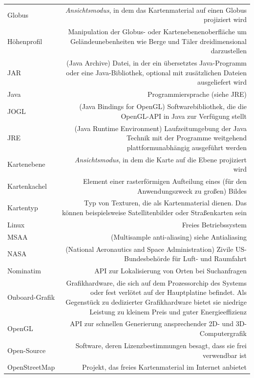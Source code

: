 \documentclass[10pt]{scrreprt}
\newcommand{\textref}[1]{\mbox{\raisebox{0.1ex}{\small$\rightarrow$ }\textit{#1}}}
\begin{document}
\begin{longtabu}{L{0.35} R{1.65}}
Globus  & \textref{Ansichtsmodus}, in dem das Kartenmaterial auf einen Globus projiziert wird\\
Höhenprofil  & Manipulation der Globus- oder Kartenebenenoberfläche um Geländeunebenheiten wie Berge und Täler dreidimensional darzustellen\\
JAR  & (Java Archive) Datei, in der ein übersetztes Java-Programm oder eine Java-Bibliothek, optional mit zusätzlichen Dateien ausgeliefert wird\\
Java  & Programmiersprache (siehe JRE)\\
JOGL  & (Java Bindings for OpenGL) Softwarebibliothek, die die OpenGL-API in Java zur Verfügung stellt\\
JRE  & (Java Runtime Environment) Laufzeitumgebung der Java Technik mit der Programme weitgehend plattformunabhängig ausgeführt werden\\
Kartenebene  & \textref{Ansichtsmodus}, in dem die Karte auf die Ebene projiziert wird\\
Kartenkachel  & Element einer rasterförmigen Aufteilung eines (für den Anwendungszweck zu großen) Bildes\\
Kartentyp & Typ von Texturen, die als Kartenmaterial dienen. Das können beispielsweise Satellitenbilder oder Straßenkarten sein\\
Linux & Freies Betriebssystem\\
MSAA   & (Multisample anti-aliasing) siehe Antialiasing\\
NASA  & (National Aeronautics and Space Administration) Zivile US-Bundesbehörde für Luft- und Raumfahrt\\
Nominatim  & API zur Lokalisierung von Orten bei Suchanfragen\\
Onboard-Grafik & Grafikhardware, die sich auf dem Prozessorchip des Systems oder fest verlötet auf der Hauptplatine befindet. Als Gegenstück zu dedizierter Grafikhardware bietet sie niedrige Leistung zu kleinem Preis und guter Energieeffizienz\\
OpenGL  & API zur schnellen Generierung ansprechender 2D- und 3D-Computergrafik\\
Open-Source & Software, deren Lizenzbestimmungen besagt, dass sie frei verwendbar ist\\
OpenStreetMap  & Projekt, das freies Kartenmaterial im Internet anbietet\\

\end{longtabu}
\end{document}
